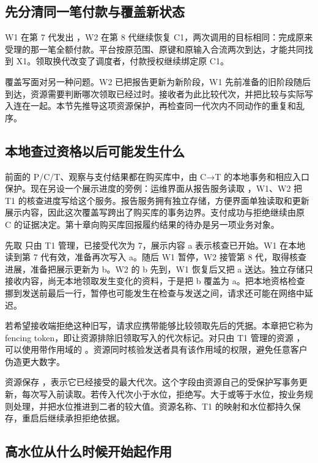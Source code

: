 \subsection*{先分清同一笔付款与覆盖新状态}

W1 在第 7 代发出 ，W2 在第 8 代继续恢复 C1，两次调用的目标相同：完成原来受理的那一笔全额付款。平台按原范围、原键和原输入合流两次到达，才能共同找到 X1。领取换代改变了调度者，付款授权继续绑定原 C1。

覆盖写面对另一种问题。W2 已把报告更新为新阶段，W1 先前准备的旧阶段随后到达，资源需要判断哪次领取已经过时。接收者为此比较代次，并把比较与实际写入连在一起。本节先推导这项资源保护，再检查同一代次内不同动作的重复和乱序。

\subsection*{本地查过资格以后可能发生什么}

前面的 P/C/T、观察与支付结果都在购买库中，由 C→T 的本地事务和相应入口保护。现在另设一个展示进度的旁例：运维界面从报告服务读取 ，W1、W2 把 T1 的核查进度写给这个服务。报告服务拥有独立存储，方便界面单独读取和更新展示内容，因此这次覆盖写跨出了购买库的事务边界。支付成功与拒绝继续由原 C 的证据决定。第十章向购买库回报履约结果的待办是另一项业务对象。

先取  只由 T1 管理，已接受代次为 7，展示内容 a 表示核查已开始。W1 在本地读到第 7 代有效，准备再次写入 a。随后 W1 暂停，W2 接管第 8 代，取得核查进展，准备把展示更新为 b。W2 的 b 先到，W1 恢复后又把 a 送达。独立存储只接收内容，尚无本地领取发生变化的资料，于是把 b 覆盖为 a。把本地资格检查挪到发送前最后一行，暂停也可能发生在检查与发送之间，请求还可能在网络中延迟。

若希望接收端拒绝这种旧写，请求应携带能够比较领取先后的凭据。本章把它称为 fencing token，即让资源排除旧领取写入的代次标记。对只由 T1 管理的资源 ，可以使用带作用域的 。资源同时核验发送者具有该作用域的权限，避免任意客户伪造更大数字。

资源保存 ，表示它已经接受的最大代次。这个字段由资源自己的受保护写事务更新，每次写入前读取。若传入代次小于水位，拒绝写。大于或等于水位，按业务规则处理，并把水位推进到二者的较大值。资源名称、T1 的映射和水位都持久保存，重启后继续承担拒绝依据。

\subsection*{高水位从什么时候开始起作用}

